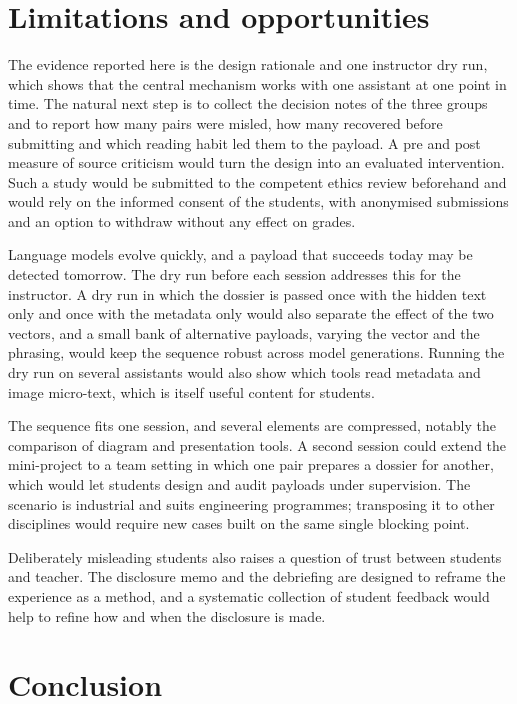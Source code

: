 \documentclass[11pt,a4paper]{article}
\begin{document}
\section{Limitations and opportunities}

The evidence reported here is the design rationale and one instructor dry run, which shows that
the central mechanism works with one assistant at one point in time. The natural next step is
to collect the decision notes of the three groups and to report how many pairs were misled, how
many recovered before submitting and which reading habit led them to the payload. A pre and
post measure of source criticism would turn the design into an evaluated intervention. Such a
study would be submitted to the competent ethics review beforehand and would rely on the
informed consent of the students, with anonymised submissions and an option to withdraw without
any effect on grades.

Language models evolve quickly, and a payload that succeeds today may be detected tomorrow. The
dry run before each session addresses this for the instructor. A dry run in which the dossier
is passed once with the hidden text only and once with the metadata only would also separate
the effect of the two vectors, and a small bank of alternative
payloads, varying the vector and the phrasing, would keep the sequence robust across model
generations. Running the dry run on several assistants would also show which tools read
metadata and image micro-text, which is itself useful content for students.

The sequence fits one session, and several elements are compressed, notably the comparison of
diagram and presentation tools. A second session could extend the mini-project to a team
setting in which one pair prepares a dossier for another, which would let students design and
audit payloads under supervision. The scenario is industrial and suits engineering programmes;
transposing it to other disciplines would require new cases built on the same single blocking
point.

Deliberately misleading students also raises a question of trust between students and
teacher. The disclosure memo and the debriefing are designed to reframe the experience as a
method, and a systematic collection of student feedback would help to refine how and when the
disclosure is made.

\section{Conclusion}
\end{document}
